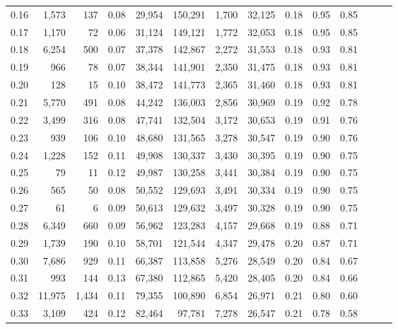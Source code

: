\begin{tabular}{rrrrrrrrrrrrrr}
0.16 &   1,573 &    137 &  0.08 &   29,954 &  150,291 &   1,700 &  32,125 &  0.18 &  0.95 &      0.85 \\
0.17 &   1,170 &     72 &  0.06 &   31,124 &  149,121 &   1,772 &  32,053 &  0.18 &  0.95 &      0.85 \\
0.18 &   6,254 &    500 &  0.07 &   37,378 &  142,867 &   2,272 &  31,553 &  0.18 &  0.93 &      0.81 \\
0.19 &     966 &     78 &  0.07 &   38,344 &  141,901 &   2,350 &  31,475 &  0.18 &  0.93 &      0.81 \\
0.20 &     128 &     15 &  0.10 &   38,472 &  141,773 &   2,365 &  31,460 &  0.18 &  0.93 &      0.81 \\
0.21 &   5,770 &    491 &  0.08 &   44,242 &  136,003 &   2,856 &  30,969 &  0.19 &  0.92 &      0.78 \\
0.22 &   3,499 &    316 &  0.08 &   47,741 &  132,504 &   3,172 &  30,653 &  0.19 &  0.91 &      0.76 \\
0.23 &     939 &    106 &  0.10 &   48,680 &  131,565 &   3,278 &  30,547 &  0.19 &  0.90 &      0.76 \\
0.24 &   1,228 &    152 &  0.11 &   49,908 &  130,337 &   3,430 &  30,395 &  0.19 &  0.90 &      0.75 \\
0.25 &      79 &     11 &  0.12 &   49,987 &  130,258 &   3,441 &  30,384 &  0.19 &  0.90 &      0.75 \\
0.26 &     565 &     50 &  0.08 &   50,552 &  129,693 &   3,491 &  30,334 &  0.19 &  0.90 &      0.75 \\
0.27 &      61 &      6 &  0.09 &   50,613 &  129,632 &   3,497 &  30,328 &  0.19 &  0.90 &      0.75 \\
0.28 &   6,349 &    660 &  0.09 &   56,962 &  123,283 &   4,157 &  29,668 &  0.19 &  0.88 &      0.71 \\
0.29 &   1,739 &    190 &  0.10 &   58,701 &  121,544 &   4,347 &  29,478 &  0.20 &  0.87 &      0.71 \\
0.30 &   7,686 &    929 &  0.11 &   66,387 &  113,858 &   5,276 &  28,549 &  0.20 &  0.84 &      0.67 \\
0.31 &     993 &    144 &  0.13 &   67,380 &  112,865 &   5,420 &  28,405 &  0.20 &  0.84 &      0.66 \\
0.32 &  11,975 &  1,434 &  0.11 &   79,355 &  100,890 &   6,854 &  26,971 &  0.21 &  0.80 &      0.60 \\
0.33 &   3,109 &    424 &  0.12 &   82,464 &   97,781 &   7,278 &  26,547 &  0.21 &  0.78 &      0.58 \\

\end{tabular}
